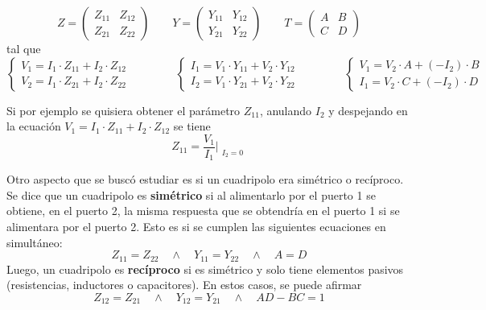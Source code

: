 \begin{equation*}
    Z  =
    \begin{pmatrix}
        Z_{11} & Z_{12} \\
        Z_{21} & Z_{22}
    \end{pmatrix}
    \qquad Y = 
    \begin{pmatrix}
        Y_{11} & Y_{12} \\
        Y_{21} & Y_{22}
    \end{pmatrix}
    \qquad T = 
    \begin{pmatrix}
        A & B \\
        C & D
    \end{pmatrix}
\end{equation*}
tal que
\begin{equation*}
    \begin{cases}
        V_1 = I_1 \cdot Z_{11} + I_2 \cdot Z_{12} \\ 
        V_2 = I_1 \cdot Z_{21} + I_2 \cdot Z_{22}
    \end{cases}
    \qquad \qquad
    \begin{cases}
        I_1 = V_1 \cdot Y_{11} + V_2 \cdot Y_{12} \\ 
        I_2 = V_1 \cdot Y_{21} + V_2 \cdot Y_{22}
    \end{cases}
    \qquad \qquad
    \begin{cases}
        V_1 = V_2 \cdot A + (-I_2) \cdot B \\ 
        I_1 = V_2 \cdot C + (-I_2) \cdot D
    \end{cases}
\end{equation*}

Si por ejemplo se quisiera obtener el parámetro $ Z_{11} $, anulando $ I_2$ y despejando en la ecuación $ V_1 = I_1 \cdot Z_{11} + I_2 \cdot Z_{12} $ se tiene
\begin{equation*}
    Z_{11} = \frac{V_1}{I_1} \Biggr|_{\substack{I_2=0}} %
\end{equation*}

\par Otro aspecto que se buscó estudiar es si un cuadripolo era simétrico o recíproco. Se dice que un cuadripolo es \textbf{simétrico} si
 al alimentarlo por el puerto 1 se obtiene, en el puerto 2, la misma respuesta que se 
 obtendría en el puerto 1 si se alimentara por el puerto 2. Esto es si se cumplen las siguientes ecuaciones en simultáneo:
\begin{equation*}
    Z_{11}=Z_{22} \quad \wedge \quad Y_{11}=Y_{22} \quad \wedge \quad A=D
\end{equation*}
Luego, un cuadripolo es \textbf{recíproco} si es simétrico y solo tiene elementos pasivos (resistencias, inductores o capacitores). En estos casos, se puede afirmar
\begin{equation*}
    Z_{12}=Z_{21} \quad \wedge \quad Y_{12}=Y_{21} \quad \wedge \quad AD-BC=1
\end{equation*}

